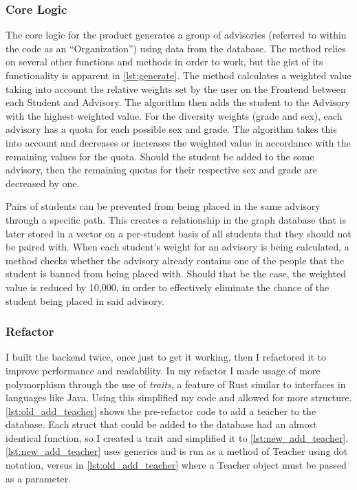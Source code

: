 \documentclass[advisory-ia.tex]{subfiles}
\begin{document}
  \subsubsection{Core Logic}
  The core logic for the product generates a group of advisories (referred to within the code as an \enquote{Organization}) using data from the database.
  The method relies on several other functions and methods in order to work, but the gist of its functionality is apparent in \cref{lst:generate}.
  The method calculates a weighted value taking into account the relative weights set by the user on the Frontend between each Student and Advisory.
  The algorithm then adds the student to the Advisory with the highest weighted value.
  For the diversity weights (grade and sex), each advisory has a quota for each possible sex and grade.
  The algorithm takes this into account and decreases or increases the weighted value in accordance with the remaining values for the quota.
  Should the student be added to the some advisory, then the remaining quotas for their respective sex and grade are decreased by one.

  Pairs of students can be prevented from being placed in the same advisory through a specific path.
  This creates a relationship in the graph database that is later stored in a vector on a per-student basis of all students that they should not be paired with.
  When each student's weight for an advisory is being calculated, a method checks whether the advisory already contains one of the people that the student is banned from being placed with.
  Should that be the case, the weighted value is reduced by 10,000, in order to effectively eliminate the chance of the student being placed in said advisory.

  

  \subsubsection{Refactor}
  I built the backend twice, once just to get it working, then I refactored it to improve performance and readability.
  In my refactor I made usage of more polymorphism through the use of \emph{traits}, a feature of Rust similar to interfaces in languages like Java.
  Using this simplified my code and allowed for more structure.
  \cref{lst:old_add_teacher} shows the pre-refactor code to add a teacher to the database.
  Each struct that could be added to the database had an almost identical function, so I created a trait and simplified it to \cref{lst:new_add_teacher}.
  \cref{lst:new_add_teacher} uses generics and is run as a method of Teacher using dot notation, versus in \cref{lst:old_add_teacher} where a Teacher object must be passed as a parameter.
\end{document}

